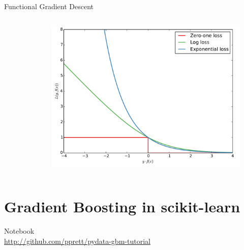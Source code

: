 \documentclass[a4paper,presentation]{beamer}
\begin{document}
\begin{frame}{Functional Gradient Descent}
\begin{columns}[c]
\begin{column}{.5\textwidth}
\begin{figure}
        \end{figure}
      \end{column}
      \begin{column}{.5\textwidth}
        \begin{figure}
          \includegraphics[scale=0.2]{./images/clf-loss-func.pdf}
        \end{figure}
      \end{column}
    \end{columns}

\end{frame}

\section{Gradient Boosting in scikit-learn}

\begin{frame}[plain]
  \begin{center}
    Notebook\\
    \href{https://github.com/pprett/pydata-gbm-tutorial}{http://github.com/pprett/pydata-gbm-tutorial}
  \end{center}
\end{frame}
\end{document}
